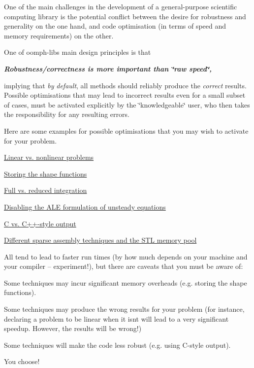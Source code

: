 One of the main challenges in the development of a general-\/purpose scientific computing library is the potential conflict between the desire for robustness and generality on the one hand, and code optimisation (in terms of speed and memory requirements) on the other.

One of {\ttfamily oomph-\/lib\textquotesingle{}s} main design principles is that

\begin{center} {\itshape {\bfseries Robustness/correctness is more important than \char`\"{}raw speed\char`\"{},}} \end{center} 

implying that {\itshape by} {\itshape default}, all methods should reliably produce the {\itshape correct} results. Possible optimisations that may lead to incorrect results even for a small subset of cases, must be activated explicitly by the \char`\"{}knowledgeable\char`\"{} user, who then takes the responsibility for any resulting errors.

Here are some examples for possible optimisations that you may wish to activate for your problem.
\begin{DoxyItemize}
\item \hyperlink{index_linear_vs_nonlinear}{Linear vs. nonlinear problems}
\item \hyperlink{index_store_shape}{Storing the shape functions}
\item \hyperlink{index_full_integration}{Full vs. reduced integration}
\item \hyperlink{index_ale}{Disabling the A\+LE formulation of unsteady equations}
\item \hyperlink{index_C_style_output}{C vs. C++-\/style output}
\item \hyperlink{index_assembly}{Different sparse assembly techniques and the S\+TL memory pool}
\end{DoxyItemize}All tend to lead to faster run times (by how much depends on your machine and your compiler -- experiment!), but there are caveats that you must be aware of\+:
\begin{DoxyItemize}
\item Some techniques may incur significant memory overheads (e.\+g. storing the shape functions).
\item Some techniques may produce the wrong results for your problem (for instance, declaring a problem to be linear when it isn\textquotesingle{}t will lead to a very significant speedup. However, the results will be wrong!)
\item Some techniques will make the code less robust (e.\+g. using C-\/style output).
\end{DoxyItemize}You choose!



